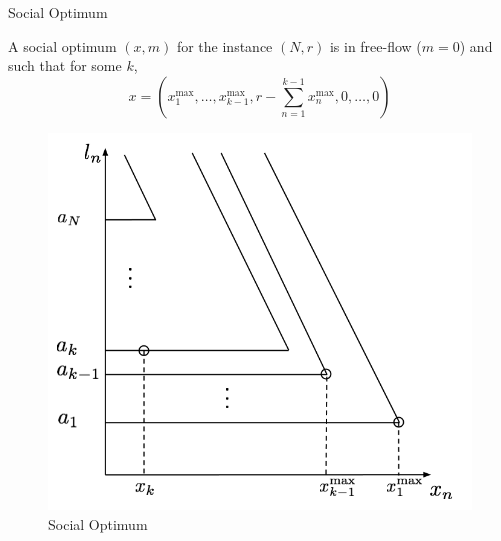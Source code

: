 \documentclass[xcolor=svgnames, english, smaller]{beamer}
\theoremstyle{plain}
\theoremstyle{definition}
\theoremstyle{plain}
\theoremstyle{plain}
\begin{document}
\begin{frame}{Social Optimum}

A social optimum $(x, m)$ for the instance $(N, r)$ is in free-flow ($m = 0$) and such that for some $k$,
\[
x = (x_1^{\max}, \dots, x_{k-1}^{\max}, r - \sum_{n = 1}^{k-1} x_n^{\max}, 0, \dots, 0)
\]


\begin{figure}
\centering
\includegraphics[scale=0.22]{../../figures/presentation/social_opt.png}
\caption{Social Optimum}
\end{figure}


\end{frame}
\end{document}
